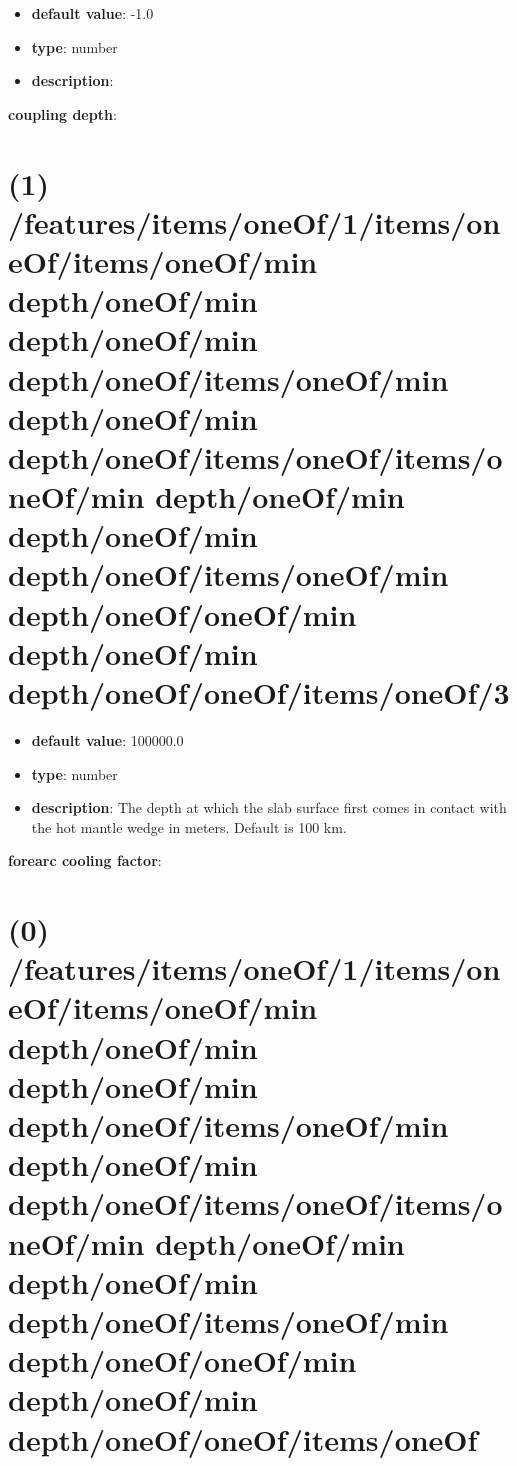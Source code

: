 \begin{itemize}[leftmargin=5em]\item {\bf default value}: -1.0
\item {\bf type}: number
\item {\bf description}: 
\end{itemize}\item {\bf coupling depth}: \section{(1) /features/items/oneOf/1/items/oneOf/items/oneOf/min depth/oneOf/min depth/oneOf/min depth/oneOf/items/oneOf/min depth/oneOf/min depth/oneOf/items/oneOf/items/oneOf/min depth/oneOf/min depth/oneOf/min depth/oneOf/items/oneOf/min depth/oneOf/oneOf/min depth/oneOf/min depth/oneOf/oneOf/items/oneOf/3}
\begin{itemize}[leftmargin=1em]\item {\bf default value}: 100000.0
\item {\bf type}: number
\item {\bf description}: The depth at which the slab surface first comes in contact with the hot mantle wedge in meters. Default is 100 km.
\end{itemize}\item {\bf forearc cooling factor}: \section{(0) /features/items/oneOf/1/items/oneOf/items/oneOf/min depth/oneOf/min depth/oneOf/min depth/oneOf/items/oneOf/min depth/oneOf/min depth/oneOf/items/oneOf/items/oneOf/min depth/oneOf/min depth/oneOf/min depth/oneOf/items/oneOf/min depth/oneOf/oneOf/min depth/oneOf/min depth/oneOf/oneOf/items/oneOf}
